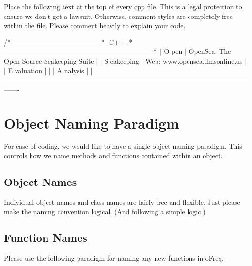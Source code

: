 Place the following text at the top of every cpp file. This is a legal protection to ensure we don't get a lawsuit. Otherwise, comment styles are completely free within the file. Please comment heavily to explain your code. \begin{DoxyVerb}/*----------------------------------------*- C++ -*------------------------------------------------------------------*\
| O pen         | OpenSea: The Open Source Seakeeping Suite                                                           |
| S eakeeping   | Web:     www.opensea.dmsonline.us                                                                   |
| E valuation   |                                                                                                     |
| A nalysis     |                                                                                                     |
\*------------------------------------------------------------------------------------------------------------------- \end{DoxyVerb}
 \hypertarget{object_paradigm}{}\section{Object Naming Paradigm}\label{object_paradigm}
For ease of coding, we would like to have a single object naming paradigm. This controls how we name methods and functions contained within an object.\hypertarget{object_paradigm_objectname}{}\subsection{Object Names}\label{object_paradigm_objectname}
Individual object names and class names are fairly free and flexible. Just please make the naming convention logical. (And following a simple logic.)\hypertarget{object_paradigm_functionname}{}\subsection{Function Names}\label{object_paradigm_functionname}
Please use the following paradigm for naming any new functions in o\-Freq.


